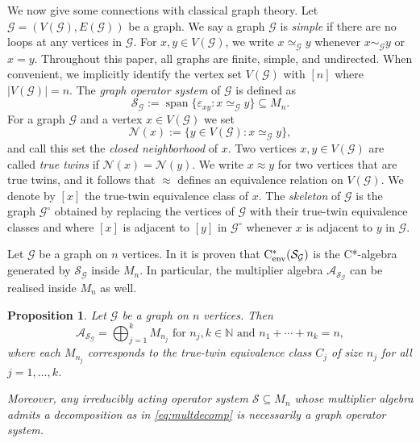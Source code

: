 \documentclass[11pt]{amsart}
\numberwithin{equation}{section}
\theoremstyle{plain}
\newtheorem{proposition}[theorem]{Proposition}
\theoremstyle{definition}
\theoremstyle{remark}
\newcommand{\A}{{\mathcal{A}}}
\newcommand{\G}{{\mathcal{G}}}
\newcommand{\N}{{\mathcal{N}}}
\renewcommand{\S}{{\mathcal{S}}}
\newcommand{\eps}{\varepsilon}
\newcommand{\bN}{\mathbb{N}}
\newcommand{\cenv}{\mathrm{C}^*_{\textup{env}}}
\newcommand{\spn}{\operatorname{span}}
\begin{document}
We now give some connections with classical graph theory. Let $\G=(V(\G), E(\G))$ be a graph. We say a graph $\G$ is \textit{simple} if there are no loops at any vertices in $\G$. For $x, y \in V(\G)$, we write $ x \simeq_{\G} y$ whenever $ x \sim_{\G} y$ or $ x=y$. Throughout this paper, all graphs are finite, simple, and undirected. When convenient, we implicitly identify the vertex set $V(\G)$ with $[n]$ where $|V(\G)|=n$.
The \emph{graph operator system} of $\G$ is defined as
\[
\S_{\G} := \spn \{\eps_{xy} : x \simeq_{\G} y\}\subseteq M_n.
\]
For a graph $\G$ and a vertex $x\in V(\G)$ we set
\[
\N(x):=\{ y\in V(\G) : x\simeq_{\G} y\},
\]
and call this set the \emph{closed neighborhood} of $x$.
Two vertices $x, y \in V(\G)$ are called  \emph{true twins} if $\N(x)=\N(y)$.
We write $x\approx y$ for two vertices that are true twins, and it follows that $\approx$ defines an equivalence relation on $V(\G)$. We denote by $ [x]$ the true-twin equivalence class of $x$.  The \textit{skeleton}   of $\G$ is the graph $\G^\circ$ obtained by replacing the vertices of $\G$ with their true-twin  equivalence classes and where $[x]$ is adjacent to $[y]$ in $\G^\circ$ whenever $x$ is adjacent to $y$ in $\G$.

Let $\G$ be a graph on $n$ vertices. In \cite[Theorem 3.2]{OP14} it is proven that $\cenv(\S_\G)$ is the C*-algebra generated by $\S_\G$ inside $M_n$. In particular, the multiplier algebra $\A_{\S_\G}$ can be realised inside $M_n$ as well.

\begin{proposition}\label{P:twin}
Let $\G$ be a graph on $n$ vertices. Then 
\begin{equation} \label{eq:multdecomp}
\A_{\S_{\G}}=\bigoplus_{j=1}^k M_{n_j} \text{ for } n_j, k\in \bN \text{ and } n_1+\cdots +n_k=n,
\end{equation}
where each $M_{n_j}$ corresponds to the true-twin equivalence class $C_j$ of size $ n_j$ for all $ j =1,\dots,k $.

Moreover, any irreducibly acting operator system $\S \subseteq M_n$ whose multiplier algebra admits a decomposition as in \eqref{eq:multdecomp} is necessarily a graph operator system.

\end{proposition}
\end{document}
